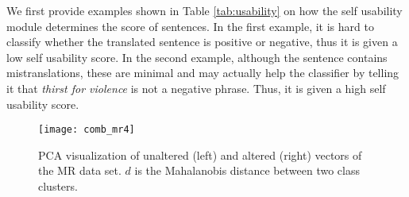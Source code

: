 \documentclass{article}
\begin{document}
We first provide examples shown in Table \ref{tab:usability} on how the self usability module determines the score of sentences. In the first example, it is hard to classify whether the translated sentence is positive or negative, thus it is given a low self usability score. In the second example, although the sentence contains mistranslations, these are minimal and may actually help the classifier by telling it that \textit{thirst for violence} is not a negative phrase. Thus, it is given a high self usability score.



\begin{figure}[!t]
    \centering
    \texttt{[image: comb\_mr4]}
\caption{PCA visualization of unaltered (left) and altered (right) vectors of the MR data set. $d$ is the Mahalanobis distance between two class clusters.}
    \label{fig:mrvecsbefaf}
\end{figure}
\end{document}
